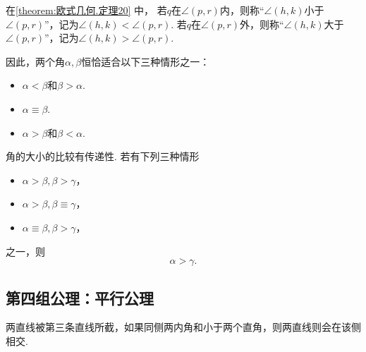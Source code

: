 \begin{figure}[ht]
	\centering
	\caption{}
	\label{figure:欧式几何.图20}
\end{figure}

\begin{definition}
在\cref{theorem:欧式几何.定理20} 中，
若\(q\)在\(\angle(p,r)\)内，则称“\(\angle(h,k)\)小于\(\angle(p,r)\)”，记为\(\angle(h,k) < \angle(p,r)\).
若\(q\)在\(\angle(p,r)\)外，则称“\(\angle(h,k)\)大于\(\angle(p,r)\)”，记为\(\angle(h,k) > \angle(p,r)\).
\end{definition}

因此，两个角\(\alpha,\beta\)恒恰适合以下三种情形之一：
\begin{itemize}
	\item \(\alpha<\beta\)和\(\beta>\alpha\).
	\item \(\alpha\equiv\beta\).
	\item \(\alpha>\beta\)和\(\beta<\alpha\).
\end{itemize}

角的大小的比较有传递性.
若有下列三种情形
\begin{itemize}
	\item \(\alpha>\beta,\beta>\gamma\)，
	\item \(\alpha>\beta,\beta\equiv\gamma\)，
	\item \(\alpha\equiv\beta,\beta>\gamma\)，
\end{itemize}
之一，则\[
	\alpha>\gamma.
\]

\subsection{第四组公理：平行公理}
\begin{axiom}[平行公理]
两直线被第三条直线所截，如果同侧两内角和小于两个直角，则两直线则会在该侧相交.
\end{axiom}

